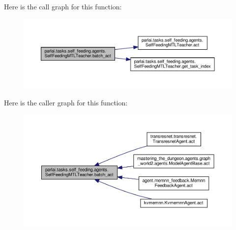 Here is the call graph for this function\+:
\nopagebreak
\begin{figure}[H]
\begin{center}
\leavevmode
\includegraphics[width=350pt]{classparlai_1_1tasks_1_1self__feeding_1_1agents_1_1SelfFeedingMTLTeacher_ab27a186b935f2194fb38e56bfe14b86c_cgraph}
\end{center}
\end{figure}
Here is the caller graph for this function\+:
\nopagebreak
\begin{figure}[H]
\begin{center}
\leavevmode
\includegraphics[width=350pt]{classparlai_1_1tasks_1_1self__feeding_1_1agents_1_1SelfFeedingMTLTeacher_ab27a186b935f2194fb38e56bfe14b86c_icgraph}
\end{center}
\end{figure}
\mbox{\label{classparlai_1_1tasks_1_1self__feeding_1_1agents_1_1SelfFeedingMTLTeacher_a19777439481c688e85f355802ff4a791}} 
